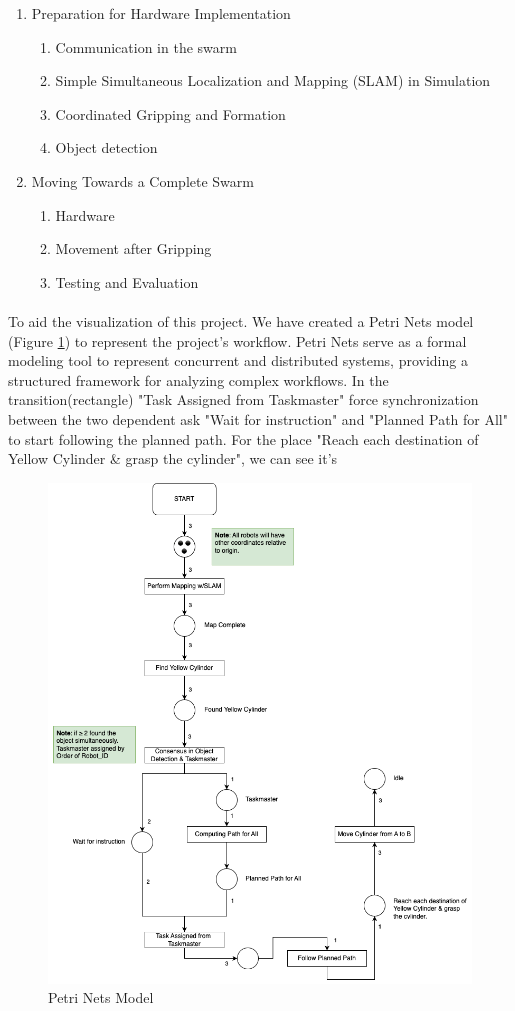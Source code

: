 \begin{enumerate}
    \item Preparation for Hardware Implementation
    \begin{enumerate}[label=1.\arabic*]
        \item Communication in the swarm
        \item Simple Simultaneous Localization and Mapping (SLAM) in Simulation
        \item Coordinated Gripping and Formation
        \item Object detection
    \end{enumerate}
    \item Moving Towards a Complete Swarm
    \begin{enumerate}[label=2.\arabic*]
        \item Hardware
        \item Movement after Gripping
        \item Testing and Evaluation
    \end{enumerate}
\end{enumerate}

\paragraph*{}
To aid the visualization of this project. We have created a Petri Nets model (Figure \ref{fig:petri_nets}) to represent the project's workflow. Petri Nets serve as a formal modeling tool to
represent concurrent and distributed systems, providing a structured framework for analyzing complex
workflows. In the transition(rectangle) "Task Assigned from Taskmaster" force synchronization between the two dependent ask "Wait for instruction" and "Planned Path for All" to start following the planned path. For the place "Reach each destination of Yellow Cylinder \& grasp the cylinder", we can see it's 

\begin{figure}[H]
    \centering
    \includegraphics[width=1\linewidth]{assets/images/introduction/petri_nets.png}
    \caption{Petri Nets Model}
    \label{fig:petri_nets}
\end{figure}
